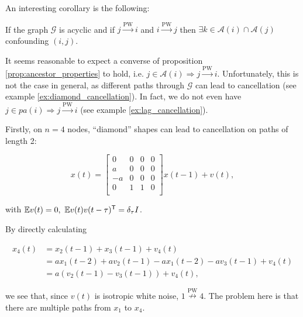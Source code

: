\documentclass[12pt]{article}
\def\pwgc{\overset{\text{PW}}{\rightarrow}}  %
\def\npwgc{\overset{\text{PW}}{\nrightarrow}}  %
\def\gcg{\mathcal{G}}  %
\newcommand{\pa}[1]{pa(#1)}  %
\newcommand{\anc}[1]{\mathcal{A}(#1)}  %
\begin{document}
An interesting corollary is the following:

\begin{corollary}
  If the graph $\gcg$ is acyclic and if $j \pwgc i$ and $i \pwgc j$ then $\exists k \in \anc{i} \cap \anc{j}$ confounding $(i, j)$.
\end{corollary}

It seems reasonable to expect a converse of proposition
\ref{prop:ancestor_properties} to hold, i.e.
$j \in \anc{i} \Rightarrow j \pwgc i$.  Unfortunately, this is not the
case in general, as different paths through $\gcg$ can lead to
cancellation (see example \ref{ex:diamond_cancellation}).  In fact, we
do not even have $j \in \pa{i} \Rightarrow j \pwgc i$ (see example
\ref{ex:lag_cancellation}).

\begin{example}
  \label{ex:diamond_cancellation}
  Firstly, on $n = 4$ nodes, ``diamond'' shapes can lead to cancellation on paths of length 2:

\begin{equation*}
  x(t) =
  \left[
    \begin{array}{cccc}
      0 & 0 & 0 & 0\\
      a & 0 & 0 & 0\\
      -a & 0 & 0 & 0\\
      0 & 1 & 1 & 0\\
    \end{array}
  \right] x(t - 1) + v(t),
\end{equation*}

with $\mathbb{E} v(t) = 0,\ \mathbb{E} v(t)v(t - \tau)^{\mathsf{T}} = \delta_\tau I$.

By directly calculating

\begin{align*}
  x_4(t) &= x_2(t - 1) + x_3(t - 1) + v_4(t)\\
         &= ax_1(t - 2) + av_2(t - 1) - ax_1(t - 2) -av_3(t - 1) + v_4(t)\\
         &= a(v_2(t - 1) - v_3(t - 1)) + v_4(t),
\end{align*}

we see that, since $v(t)$ is isotropic white noise, $1 \npwgc 4$.  The problem here is that there are multiple paths from $x_1$ to $x_4$.
\end{example}
\end{document}
